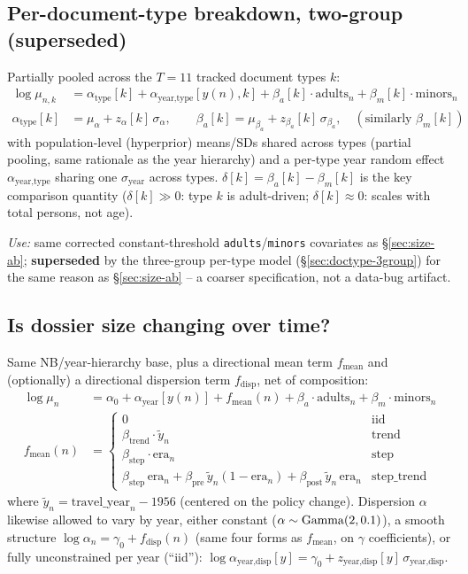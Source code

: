 \subsection{Per-document-type breakdown, two-group (superseded)}
\label{sec:doctype-2group}

Partially pooled across the $T=11$ tracked document types $k$:
\begin{align}
  \log\mu_{n,k} &= \alpha_{\text{type}}[k] + \alpha_{\text{year,type}}[y(n),k]
    + \beta_a[k]\cdot\text{adults}_n + \beta_m[k]\cdot\text{minors}_n \\
  \alpha_{\text{type}}[k] &= \mu_\alpha + z_\alpha[k]\,\sigma_\alpha, \qquad
    \beta_a[k] = \mu_{\beta_a} + z_{\beta_a}[k]\,\sigma_{\beta_a}, \quad(\text{similarly } \beta_m[k])
\end{align}
with population-level (hyperprior) means/SDs shared across types (partial
pooling, same rationale as the year hierarchy) and a per-type year random
effect $\alpha_{\text{year,type}}$ sharing one $\sigma_{\text{year}}$ across
types. $\delta[k] = \beta_a[k]-\beta_m[k]$ is the key comparison quantity
($\delta[k]\gg0$: type $k$ is adult-driven; $\delta[k]\approx0$: scales with
total persons, not age).

\textit{Use:} same corrected constant-threshold \texttt{adults}/\texttt{minors}
covariates as \S\ref{sec:size-ab}; \textbf{superseded} by the three-group
per-type model (\S\ref{sec:doctype-3group}) for the same reason as
\S\ref{sec:size-ab} -- a coarser specification, not a data-bug artifact.

\subsection{Is dossier size changing over time?}
\label{sec:temporal}

Same NB/year-hierarchy base, plus a directional mean term $f_{\text{mean}}$
and (optionally) a directional dispersion term $f_{\text{disp}}$, net of
composition:
\begin{align}
  \log\mu_n &= \alpha_0 + \alpha_{\text{year}}[y(n)] + f_{\text{mean}}(n)
    + \beta_a\cdot\text{adults}_n + \beta_m\cdot\text{minors}_n \\
  f_{\text{mean}}(n) &=
    \begin{cases}
      0 & \text{iid} \\
      \beta_{\text{trend}}\cdot \tilde y_n & \text{trend} \\
      \beta_{\text{step}}\cdot \text{era}_n & \text{step} \\
      \beta_{\text{step}}\,\text{era}_n + \beta_{\text{pre}}\,\tilde y_n(1{-}\text{era}_n) + \beta_{\text{post}}\,\tilde y_n\,\text{era}_n & \text{step\_trend}
    \end{cases}
\end{align}
where $\tilde y_n = \text{travel\_year}_n - 1956$ (centered on the policy
change). Dispersion $\alpha$ likewise allowed to vary by year, either
constant ($\alpha \sim \mathrm{Gamma}(2, 0.1)$), a smooth structure
$\log\alpha_n = \gamma_0 + f_{\text{disp}}(n)$ (same four forms as
$f_{\text{mean}}$, on $\gamma$ coefficients), or fully unconstrained per year
(``iid''): $\log\alpha_{\text{year,disp}}[y] = \gamma_0 + z_{\text{year,disp}}[y]\,\sigma_{\text{year,disp}}$.

